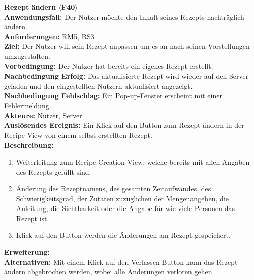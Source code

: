 \documentclass[parskip=full]{scrartcl}
\begin{document}
\textbf{Rezept ändern $\langle$F40$\rangle$}\\
\textbf{Anwendungsfall:} Der Nutzer möchte den Inhalt seines Rezepts nachträglich ändern.\\
\textbf{Anforderungen:} RM5, RS3\\
\textbf{Ziel:} Der Nutzer will sein Rezept anpassen um es an nach seinen Vorstellungen umzugestalten.\\
\textbf{Vorbedingung:} Der Nutzer hat bereits ein eigenes Rezept erstellt.\\
\textbf{Nachbedingung Erfolg:} Das aktualisierte Rezept wird wieder auf den Server geladen und den eingestellten Nutzern aktualisiert angezeigt. \\
\textbf{Nachbedingung Fehlschlag:} Ein Pop-up-Fenster erscheint mit einer Fehlermeldung.\\
\textbf{Akteure:} Nutzer, Server\\
\textbf{Auslösendes Ereignis:} Ein Klick auf den Button zum Rezept ändern in der Recipe View von einem selbst erstellten Rezept.\\
\textbf{Beschreibung:}
\begin{enumerate}
    \item Weiterleitung zum Recipe Creation View, welche bereits mit allen Angaben des Rezepts gefüllt sind.
    \item Änderung des Rezeptnamens, des gesamten Zeitaufwandes, des Schwierigkeitsgrad, der Zutaten zuzüglichen der Mengenangeben, die Anleitung, die Sichtbarkeit oder die Angabe für wie viele Personen das Rezept ist.
    \item Klick auf den Button werden die Änderungen am Rezept gespeichert.
\end{enumerate}
\textbf{Erweiterung:} -\\
\textbf{Alternativen:} Mit einem Klick auf den Verlassen Button kann das Rezept ändern abgebrochen werden, wobei alle Änderungen verloren gehen.\\
\newpage
\end{document}
